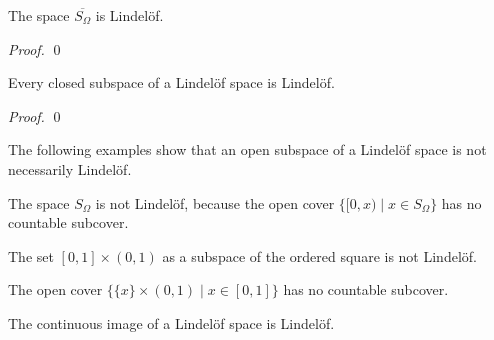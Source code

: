 \begin{example}[AC]
    The space $\overline{S_\Omega}$ is Lindel\"{o}f.

    \begin{proof}
        \pf
        \step{3}{\pick\ $\alpha < \Omega$ such that $(\alpha, \Omega] \subseteq U$}
        \qed
    \end{proof}
\end{example}

\begin{proposition}
    Every closed subspace of a Lindel\"{o}f space is Lindel\"{o}f.
\end{proposition}

\begin{proof}
    \pf
    \qed
\end{proof}

The following examples show that an open subspace of a Lindel\"{o}f space is not
necessarily Lindel\"{o}f.
\begin{example}
    The space $S_\Omega$ is not Lindel\"{o}f, because the open cover $\{ [0,x) \mid
    x \in S_\Omega \}$ has no countable subcover.
\end{example}

\begin{example}
    The set $[0,1] \times (0,1)$ as a subspace of the ordered square is not Lindel\"{o}f.

    The open cover $\{ \{x\} \times (0,1) \mid x \in [0,1] \}$ has no countable subcover.
\end{example}

\begin{proposition}[Choice]
    The continuous image of a Lindel\"{o}f space is Lindel\"{o}f.
\end{proposition}

